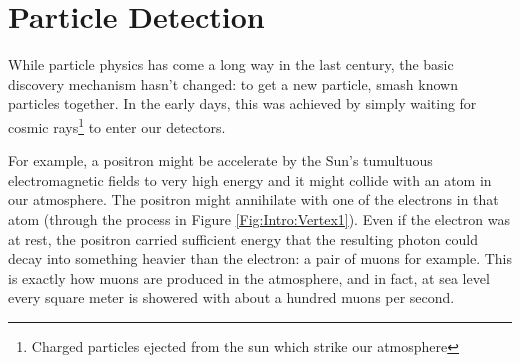 \chapter{Particle Detection}\label{Sec:CMS}
While particle physics has come a long way in the last century, the basic discovery mechanism hasn't changed: to get a new particle, smash known particles together. In the early days, this was achieved by simply waiting for cosmic rays\footnote{Charged particles ejected from the sun which strike our atmosphere} to enter our detectors.

For example, a positron might be accelerate by the Sun's tumultuous electromagnetic fields to very high energy and it might collide with an atom in our atmosphere. The positron might annihilate with one of the electrons in that atom (through the process in Figure \ref{Fig:Intro:Vertex1}). Even if the electron was at rest, the positron carried sufficient energy that the resulting photon could decay into something heavier than the electron: a pair of muons for example. This is exactly how muons are produced in the atmosphere, and in fact, at sea level every square meter is showered with about a hundred muons per second.

